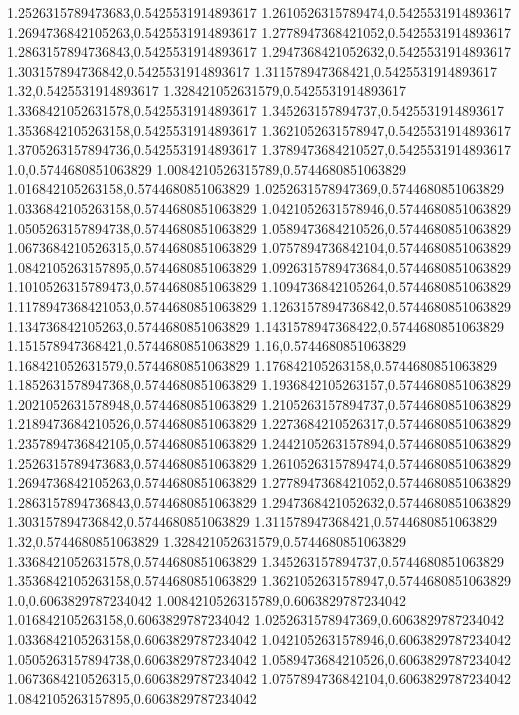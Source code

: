 1.2526315789473683,0.5425531914893617
1.2610526315789474,0.5425531914893617
1.2694736842105263,0.5425531914893617
1.2778947368421052,0.5425531914893617
1.2863157894736843,0.5425531914893617
1.2947368421052632,0.5425531914893617
1.303157894736842,0.5425531914893617
1.311578947368421,0.5425531914893617
1.32,0.5425531914893617
1.328421052631579,0.5425531914893617
1.3368421052631578,0.5425531914893617
1.345263157894737,0.5425531914893617
1.3536842105263158,0.5425531914893617
1.3621052631578947,0.5425531914893617
1.3705263157894736,0.5425531914893617
1.3789473684210527,0.5425531914893617
1.0,0.5744680851063829
1.0084210526315789,0.5744680851063829
1.016842105263158,0.5744680851063829
1.0252631578947369,0.5744680851063829
1.0336842105263158,0.5744680851063829
1.0421052631578946,0.5744680851063829
1.0505263157894738,0.5744680851063829
1.0589473684210526,0.5744680851063829
1.0673684210526315,0.5744680851063829
1.0757894736842104,0.5744680851063829
1.0842105263157895,0.5744680851063829
1.0926315789473684,0.5744680851063829
1.1010526315789473,0.5744680851063829
1.1094736842105264,0.5744680851063829
1.1178947368421053,0.5744680851063829
1.1263157894736842,0.5744680851063829
1.134736842105263,0.5744680851063829
1.1431578947368422,0.5744680851063829
1.151578947368421,0.5744680851063829
1.16,0.5744680851063829
1.168421052631579,0.5744680851063829
1.176842105263158,0.5744680851063829
1.1852631578947368,0.5744680851063829
1.1936842105263157,0.5744680851063829
1.2021052631578948,0.5744680851063829
1.2105263157894737,0.5744680851063829
1.2189473684210526,0.5744680851063829
1.2273684210526317,0.5744680851063829
1.2357894736842105,0.5744680851063829
1.2442105263157894,0.5744680851063829
1.2526315789473683,0.5744680851063829
1.2610526315789474,0.5744680851063829
1.2694736842105263,0.5744680851063829
1.2778947368421052,0.5744680851063829
1.2863157894736843,0.5744680851063829
1.2947368421052632,0.5744680851063829
1.303157894736842,0.5744680851063829
1.311578947368421,0.5744680851063829
1.32,0.5744680851063829
1.328421052631579,0.5744680851063829
1.3368421052631578,0.5744680851063829
1.345263157894737,0.5744680851063829
1.3536842105263158,0.5744680851063829
1.3621052631578947,0.5744680851063829
1.0,0.6063829787234042
1.0084210526315789,0.6063829787234042
1.016842105263158,0.6063829787234042
1.0252631578947369,0.6063829787234042
1.0336842105263158,0.6063829787234042
1.0421052631578946,0.6063829787234042
1.0505263157894738,0.6063829787234042
1.0589473684210526,0.6063829787234042
1.0673684210526315,0.6063829787234042
1.0757894736842104,0.6063829787234042
1.0842105263157895,0.6063829787234042
